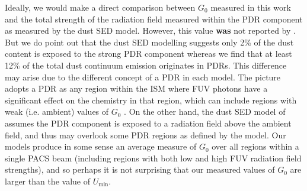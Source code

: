 \documentclass[preprint2]{aastex}
\begin{document}
Ideally, we would make a direct comparison between $G_{0}$ measured in this work and the total strength of the radiation field measured within the PDR component as measured by the dust SED model.  However, this value \textbf{was} not reported by \citet{2012ApJ...755..165M}.  But we do point out that the dust SED modelling suggests only 2\% of the dust content is exposed to the strong PDR component whereas we find that at least 12\% of the total dust continuum emission originates in PDRs.  This difference may arise due to the different concept of a PDR in each model.  The \citet{1999ApJ...527..795K} picture adopts a PDR as any region within the ISM where FUV photons have a significant effect on the chemistry in that region, which can include regions with weak (i.e. ambient) values of $G_{0}$ \citep{1985ApJ...291..722T}.  On the other hand, the dust SED model of \citet{2007ApJ...657..810D} assumes the PDR component is exposed to a radiation field above the ambient field, and thus may overlook some PDR regions as defined by the \citet{1999ApJ...527..795K} model.  Our models produce in some sense an average measure of $G_{0}$ over all regions within a single PACS beam (including regions with both low and high FUV radiation field strengths), and so perhaps it is not surprising that our measured values of $G_{0}$ are larger than the value of $U_{\mathrm{min}}$.

\end{document}
